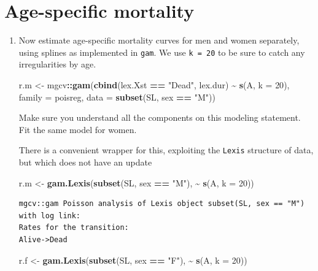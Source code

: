 \documentclass[
]{book}
\newenvironment{Shaded}{\begin{snugshade}}{\end{snugshade}}
\newcommand{\AttributeTok}[1]{\textcolor[rgb]{0.13,0.29,0.53}{#1}}
\newcommand{\DecValTok}[1]{\textcolor[rgb]{0.00,0.00,0.81}{#1}}
\newcommand{\FunctionTok}[1]{\textcolor[rgb]{0.13,0.29,0.53}{\textbf{#1}}}
\newcommand{\NormalTok}[1]{#1}
\newcommand{\OtherTok}[1]{\textcolor[rgb]{0.56,0.35,0.01}{#1}}
\newcommand{\SpecialCharTok}[1]{\textcolor[rgb]{0.81,0.36,0.00}{\textbf{#1}}}
\newcommand{\StringTok}[1]{\textcolor[rgb]{0.31,0.60,0.02}{#1}}
\begin{document}
\section{Age-specific mortality}\label{age-specific-mortality}

\begin{enumerate}
\def\labelenumi{\arabic{enumi}.}
\item
  Now estimate age-specific mortality curves for men and
  women separately, using splines as implemented in \texttt{gam}.
  We use \texttt{k\ =\ 20} to be sure to catch any irregularities by age.

\begin{Shaded}
\begin{Highlighting}[]
\NormalTok{r.m }\OtherTok{\textless{}{-}}\NormalTok{ mgcv}\SpecialCharTok{::}\FunctionTok{gam}\NormalTok{(}\FunctionTok{cbind}\NormalTok{(lex.Xst }\SpecialCharTok{==} \StringTok{"Dead"}\NormalTok{, lex.dur) }\SpecialCharTok{\textasciitilde{}} \FunctionTok{s}\NormalTok{(A, }\AttributeTok{k =} \DecValTok{20}\NormalTok{),}
                 \AttributeTok{family =}\NormalTok{ poisreg,}
                   \AttributeTok{data =} \FunctionTok{subset}\NormalTok{(SL, sex }\SpecialCharTok{==} \StringTok{"M"}\NormalTok{))}
\end{Highlighting}
\end{Shaded}

  Make sure you understand all the components on this modeling statement.
  Fit the same model for women.

  There is a convenient wrapper for this, exploiting the \texttt{Lexis}
  structure of data, but which does not have an update

\begin{Shaded}
\begin{Highlighting}[]
\NormalTok{r.m }\OtherTok{\textless{}{-}} \FunctionTok{gam.Lexis}\NormalTok{(}\FunctionTok{subset}\NormalTok{(SL, sex }\SpecialCharTok{==} \StringTok{"M"}\NormalTok{), }\SpecialCharTok{\textasciitilde{}} \FunctionTok{s}\NormalTok{(A, }\AttributeTok{k =} \DecValTok{20}\NormalTok{))}
\end{Highlighting}
\end{Shaded}

\begin{verbatim}
mgcv::gam Poisson analysis of Lexis object subset(SL, sex == "M") with log link:
Rates for the transition:
Alive->Dead
\end{verbatim}

\begin{Shaded}
\begin{Highlighting}[]
\NormalTok{r.f }\OtherTok{\textless{}{-}} \FunctionTok{gam.Lexis}\NormalTok{(}\FunctionTok{subset}\NormalTok{(SL, sex }\SpecialCharTok{==} \StringTok{"F"}\NormalTok{), }\SpecialCharTok{\textasciitilde{}} \FunctionTok{s}\NormalTok{(A, }\AttributeTok{k =} \DecValTok{20}\NormalTok{))}
\end{Highlighting}
\end{Shaded}


\end{enumerate}
\end{document}
